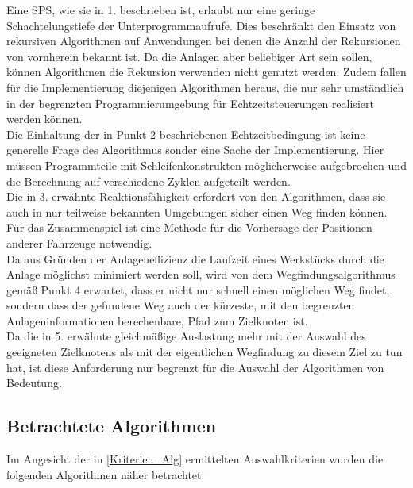 		Eine \ac{SPS}, wie sie in 1. beschrieben ist, erlaubt nur eine geringe Schachtelungstiefe der Unterprogrammaufrufe. Dies beschränkt den Einsatz von rekursiven Algorithmen auf Anwendungen bei denen die Anzahl der Rekursionen von vornherein bekannt ist. Da die Anlagen aber beliebiger Art sein sollen, können Algorithmen die Rekursion verwenden nicht genutzt werden. Zudem fallen für die Implementierung diejenigen Algorithmen heraus, die nur sehr umständlich in der begrenzten Programmierumgebung für Echtzeitsteuerungen realisiert werden können.\\
		Die Einhaltung der in Punkt 2 beschriebenen Echtzeitbedingung ist keine generelle Frage des Algorithmus sonder eine Sache der Implementierung. Hier müssen Programmteile mit Schleifenkonstrukten möglicherweise aufgebrochen und die Berechnung auf verschiedene Zyklen aufgeteilt werden.\\
		Die in 3. erwähnte Reaktionsfähigkeit erfordert von den Algorithmen, dass sie auch in nur teilweise bekannten Umgebungen sicher einen Weg finden können. Für das Zusammenspiel ist eine Methode für die Vorhersage der Positionen anderer Fahrzeuge notwendig.\\
		Da aus Gründen der Anlageneffizienz die Laufzeit eines Werkstücks durch die Anlage möglichst minimiert werden soll, wird von dem Wegfindungsalgorithmus gemäß Punkt 4 erwartet, dass er nicht nur schnell einen möglichen Weg findet, sondern dass der gefundene Weg auch der kürzeste, mit den begrenzten Anlageninformationen berechenbare, Pfad zum Zielknoten ist.\\
		Da die in 5. erwähnte gleichmäßige Auslastung mehr mit der Auswahl des geeigneten Zielknotens als mit der eigentlichen Wegfindung zu diesem Ziel zu tun hat, ist diese Anforderung nur begrenzt für die Auswahl der Algorithmen von Bedeutung.
		
	\subsection{Betrachtete Algorithmen}
		\label{Betrachtete_Algorithmen}
		Im Angesicht der in \ref{Kriterien_Alg} ermittelten Auswahlkriterien wurden die folgenden Algorithmen näher betrachtet:
		
